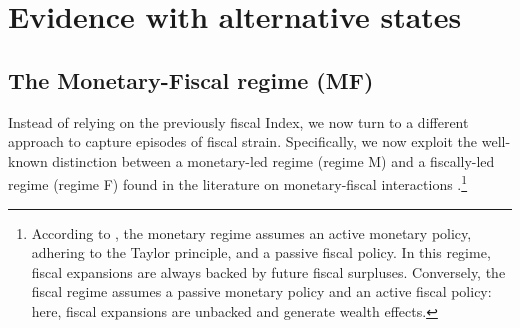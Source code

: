 \documentclass[12pt]{article}%
\theoremstyle{remark}
\begin{document}


 \section{Evidence with alternative states \label{app: sec: altern}}
\subsection{The Monetary-Fiscal regime (MF)}
Instead of relying on the previously fiscal Index, we now turn to a different approach to capture episodes of fiscal strain. Specifically, we now exploit the well-known distinction between a monetary-led regime (regime M) and a fiscally-led regime (regime F) found in the literature on monetary-fiscal interactions \citep[see][]{Bianchi2012,Bianchiillut, BM2014,BM2017,Chung2007}.\footnote{According to \cite{Leeper1991}, the monetary regime assumes an active monetary policy, adhering to the Taylor principle, and a passive fiscal policy. In this regime, fiscal expansions are always backed by future fiscal surpluses. Conversely, the fiscal regime assumes a passive monetary policy and an active fiscal policy: here, fiscal expansions are unbacked and generate wealth effects.} 
\end{document}
